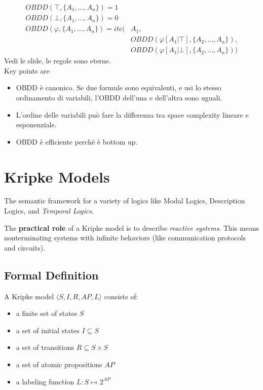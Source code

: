 \documentclass{article}
\begin{document}
\begin{align*}
    OBDD(\top,\{A_1,\dots,A_n\}) = 1 & \\
    OBDD(\bot,\{A_1,\dots,A_n\}) = 0 & \\
    OBDD(\varphi,\{A_1,\dots,A_n\}) = ite(& A_1, \\
                                     & OBDD(\varphi[A_1|\top], \{A_2,\dots,A_n\}), \\
                                     & OBDD(\varphi[A_1|\bot],\{A_2,\dots,A_n\}))
\end{align*}
Vedi le slide, le regole sono eterne.\\
Key points are
\begin{itemize}
    \item OBDD è canonico. Se due formule sono equivalenti, e usi lo stesso ordinamento di variabili, l'OBDD dell'una e dell'altra sono uguali.
    \item L'ordine delle variabili può fare la differenza tra space complexity lineare e esponenziale.
    \item OBDD è efficiente perché è bottom up.
\end{itemize}

\section{Kripke Models}
The semantic framework for a variety of logics like Modal Logics, Description Logics, and \textit{Temporal Logics}.

The \textbf{practical role} of a Kripke model is to describe \textit{reactive systems}. This means nonterminating systems with infinite behaviors (like communication protocols and circuits).

\subsection{Formal Definition}
A Kripke model $\langle S, I, R, AP, L\rangle$ consists of:
\begin{itemize}
    \item a finite set of states $S$
    \item a set of initial states $I \subseteq S$
    \item a set of transitions $R\subseteq S\times S$
    \item a set of atomic propositions $AP$
    \item a labeling function $L: S\mapsto 2^{AP}$
\end{itemize}
\end{document}
